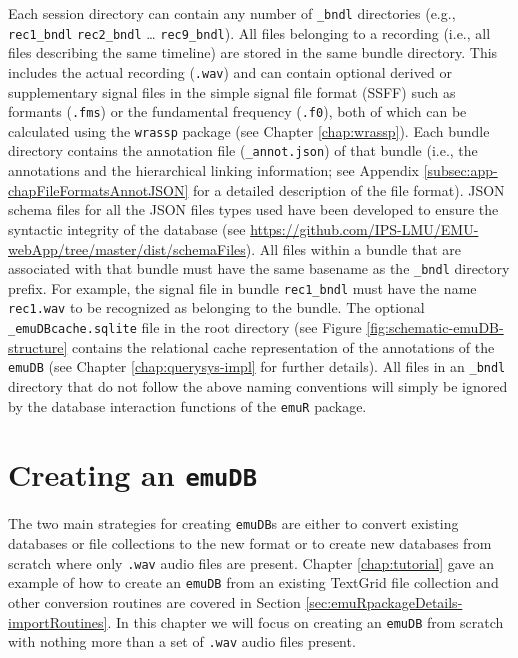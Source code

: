 \documentclass[]{book}
\theoremstyle{definition}
\theoremstyle{definition}
\theoremstyle{definition}
\theoremstyle{remark}
\begin{document}
Each session directory can contain any number of \texttt{\_bndl}
directories (e.g., \texttt{rec1\_bndl} \texttt{rec2\_bndl} \ldots{}
\texttt{rec9\_bndl}). All files belonging to a recording (i.e., all
files describing the same timeline) are stored in the same bundle
directory. This includes the actual recording (\texttt{.wav}) and can
contain optional derived or supplementary signal files in the simple
signal file format (SSFF) \citep{cassidy:2013a} such as formants
(\texttt{.fms}) or the fundamental frequency (\texttt{.f0}), both of
which can be calculated using the \texttt{wrassp} package (see Chapter
\ref{chap:wrassp}). Each bundle directory contains the annotation file
(\texttt{\_annot.json}) of that bundle (i.e., the annotations and the
hierarchical linking information; see Appendix
\ref{subsec:app-chapFileFormatsAnnotJSON} for a detailed description of
the file format). JSON schema files for all the JSON files types used
have been developed to ensure the syntactic integrity of the database
(see
\url{https://github.com/IPS-LMU/EMU-webApp/tree/master/dist/schemaFiles}).
All files within a bundle that are associated with that bundle must have
the same basename as the \texttt{\_bndl} directory prefix. For example,
the signal file in bundle \texttt{rec1\_bndl} must have the name
\texttt{rec1.wav} to be recognized as belonging to the bundle. The
optional \texttt{\_emuDBcache.sqlite} file in the root directory (see
Figure \ref{fig:schematic-emuDB-structure} contains the relational cache
representation of the annotations of the \texttt{emuDB} (see Chapter
\ref{chap:querysys-impl} for further details). All files in an
\texttt{\_bndl} directory that do not follow the above naming
conventions will simply be ignored by the database interaction functions
of the \texttt{emuR} package.

\hypertarget{creating-an-emudb}{%
\section{\texorpdfstring{Creating an
\texttt{emuDB}}{Creating an emuDB}}\label{creating-an-emudb}}

The two main strategies for creating \texttt{emuDB}s are either to
convert existing databases or file collections to the new format or to
create new databases from scratch where only \texttt{.wav} audio files
are present. Chapter \ref{chap:tutorial} gave an example of how to
create an \texttt{emuDB} from an existing TextGrid file collection and
other conversion routines are covered in Section
\ref{sec:emuRpackageDetails-importRoutines}. In this chapter we will
focus on creating an \texttt{emuDB} from scratch with nothing more than
a set of \texttt{.wav} audio files present.
\end{document}
